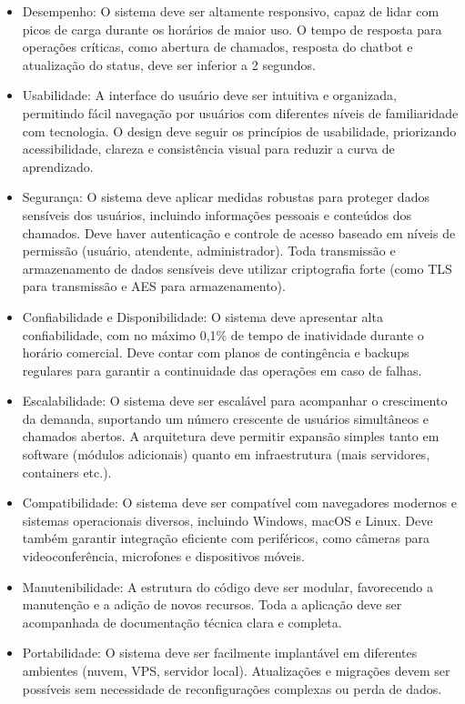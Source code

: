 \documentclass[a4paper,12pt]{article}
\begin{document}
\begin{itemize}
    \item Desempenho: O sistema deve ser altamente responsivo, capaz de lidar com picos de carga durante os horários de maior uso. O tempo de resposta para operações críticas, como abertura de chamados, resposta do chatbot e atualização do status, deve ser inferior a 2 segundos.
    \item Usabilidade: A interface do usuário deve ser intuitiva e organizada, permitindo fácil navegação por usuários com diferentes níveis de familiaridade com tecnologia. O design deve seguir os princípios de usabilidade, priorizando acessibilidade, clareza e consistência visual para reduzir a curva de aprendizado.
    \item Segurança: O sistema deve aplicar medidas robustas para proteger dados sensíveis dos usuários, incluindo informações pessoais e conteúdos dos chamados. Deve haver autenticação e controle de acesso baseado em níveis de permissão (usuário, atendente, administrador). Toda transmissão e armazenamento de dados sensíveis deve utilizar criptografia forte (como TLS para transmissão e AES para armazenamento).
    \item Confiabilidade e Disponibilidade: O sistema deve apresentar alta confiabilidade, com no máximo 0,1\% de tempo de inatividade durante o horário comercial. Deve contar com planos de contingência e backups regulares para garantir a continuidade das operações em caso de falhas.
    \item Escalabilidade: O sistema deve ser escalável para acompanhar o crescimento da demanda, suportando um número crescente de usuários simultâneos e chamados abertos. A arquitetura deve permitir expansão simples tanto em software (módulos adicionais) quanto em infraestrutura (mais servidores, containers etc.).
    \item Compatibilidade: O sistema deve ser compatível com navegadores modernos e sistemas operacionais diversos, incluindo Windows, macOS e Linux. Deve também garantir integração eficiente com periféricos, como câmeras para videoconferência, microfones e dispositivos móveis.
    \item Manutenibilidade: A estrutura do código deve ser modular, favorecendo a manutenção e a adição de novos recursos. Toda a aplicação deve ser acompanhada de documentação técnica clara e completa.
    \item Portabilidade: O sistema deve ser facilmente implantável em diferentes ambientes (nuvem, VPS, servidor local). Atualizações e migrações devem ser possíveis sem necessidade de reconfigurações complexas ou perda de dados.
\end{itemize}
\end{document}
